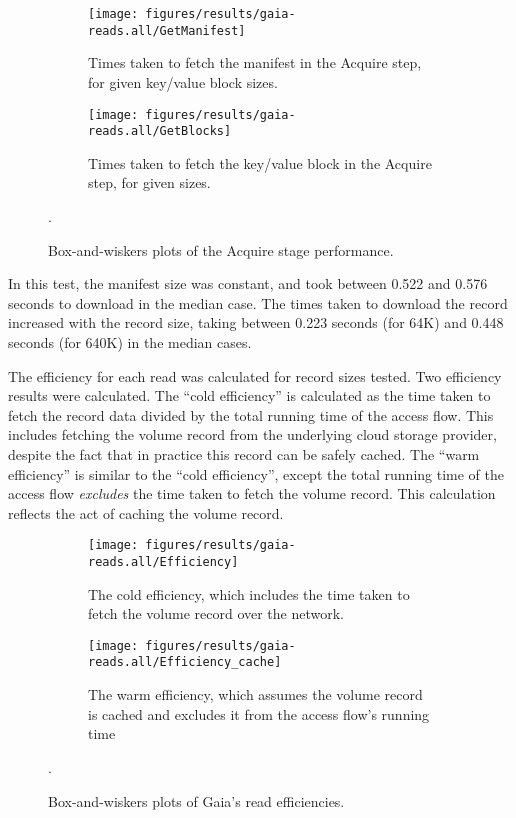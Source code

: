 \begin{figure}[htp!]
   \centering
   \begin{subfigure}[b]{.8\textwidth}
      \texttt{[image: figures/results/gaia-reads.all/GetManifest]}
      \label{fig:gaia-read-getmanifest}
      \caption{Times taken to fetch the manifest in the Acquire step, for given
      key/value block sizes.}
   \end{subfigure}
   \begin{subfigure}[b]{.8\textwidth}
      \texttt{[image: figures/results/gaia-reads.all/GetBlocks]}
      \label{fig:gaia-read-discover}
      \caption{Times taken to fetch the key/value block in the Acquire step, for
      given sizes.}
   \end{subfigure}
   \caption{Box-and-wiskers plots of the Acquire stage performance.}
   \label{fig:gaia-acquire-breakdown}.
\end{figure}

In this test, the manifest size was constant, and took between 0.522 and 0.576 
seconds to download in the median case.  The times taken to download the record
increased with the record size, taking between 0.223 seconds (for 64K) and 0.448
seconds (for 640K) in the median cases.

The efficiency for each read was calculated for record sizes tested.  Two
efficiency results were calculated.  The ``cold efficiency'' is calculated as
the time taken to fetch the record data
divided by the total running time of the access flow.  This includes fetching
the volume record from the underlying cloud storage provider, despite the fact
that in practice this record can be safely cached.  The ``warm efficiency'' is
similar to the ``cold efficiency'', except the total running time of the access
flow \emph{excludes} the time taken to fetch the volume record.  This
calculation reflects the act of caching the volume record.

\begin{figure}[htp!]
   \centering
   \begin{subfigure}[b]{.8\textwidth}
      \texttt{[image: figures/results/gaia-reads.all/Efficiency]}
      \label{fig:gaia-read-getmanifest}
      \caption{The cold efficiency, which includes the time taken to fetch the
      volume record over the network.}
   \end{subfigure}
   \begin{subfigure}[b]{.8\textwidth}
      \texttt{[image: figures/results/gaia-reads.all/Efficiency\_cache]}
      \label{fig:gaia-read-discover}
      \caption{The warm efficiency, which assumes the volume record is cached
      and excludes it from the access flow's running time}
   \end{subfigure}
   \caption{Box-and-wiskers plots of Gaia's read efficiencies.}
   \label{fig:gaia-read-efficiencies}.
\end{figure}

